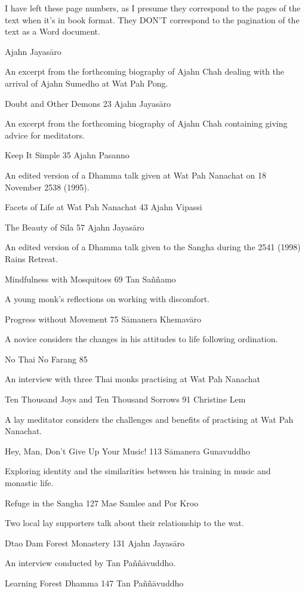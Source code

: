 I have left these page numbers, as I presume they correspond to the
pages of the text when it's in book format. They DON'T correspond to the
pagination of the text as a Word document.

Ajahn Jayasāro

An excerpt from the forthcoming biography of Ajahn Chah dealing with the
arrival of Ajahn Sumedho at Wat Pah Pong.

Doubt and Other Demons 23 Ajahn Jayasāro

An excerpt from the forthcoming biography of Ajahn Chah containing
giving advice for meditators.

Keep It Simple 35 Ajahn Pasanno

An edited version of a Dhamma talk given at Wat Pah Nanachat on 18
November 2538 (1995).

Facets of Life at Wat Pah Nanachat 43 Ajahn Vipassi

The Beauty of Sīla 57 Ajahn Jayasāro

An edited version of a Dhamma talk given to the Sangha during the 2541
(1998) Rains Retreat.

Mindfulness with Mosquitoes 69 Tan Saññamo

A young monk's reflections on working with discomfort.

Progress without Movement 75 Sāmanera Khemavāro

A novice considers the changes in his attitudes to life following
ordination.

No Thai No Farang 85

An interview with three Thai monks practising at Wat Pah Nanachat

Ten Thousand Joys and Ten Thousand Sorrows 91 Christine Lem

A lay meditator considers the challenges and benefits of practising at
Wat Pah Nanachat.

Hey, Man, Don't Give Up Your Music! 113 Sāmanera Gunavuddho

Exploring identity and the similarities between his training in music
and monastic life.

Refuge in the Sangha 127 Mae Samlee and Por Kroo

Two local lay supporters talk about their relationship to the wat.

Dtao Dam Forest Monastery 131 Ajahn Jayasāro

An interview conducted by Tan Paññāvuddho.

Learning Forest Dhamma 147 Tan Paññāvuddho

